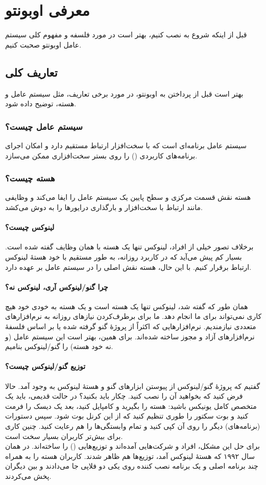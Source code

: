 \chapter{معرفی اوبونتو}
قبل از اینکه شروع به نصب کنیم، بهتر است در مورد فلسفه و مفهوم کلی سیستم عامل اوبونتو صحبت کنیم.
\section{تعاریف کلی}
بهتر است قبل از پرداختن به اوبونتو، در مورد برخی تعاریف، مثل سیستم عامل و هسته، توضیح داده شود.
\subsection{سیستم عامل چیست؟}
سیستم عامل برنامه‌ای است که با سخت‌افزار ارتباط مستقیم دارد و امکان اجرای برنامه‌های کاربردی () را روی بستر سخت‌افزاری ممکن می‌سازد.
\subsection{هسته چیست؟}
هسته نقش قسمت مرکزی و سطح پایین یک سیستم عامل را ایفا می‌کند و وظایفی مانند ارتباط با سخت‌افزار و بارگذاری درایورها را به دوش می‌کشد.
\subsubsection{لینوکس چیست؟}
برخلاف تصور خیلی از افراد، لینوکس تنها یک هسته با همان وظایف گفته شده است. بسیار کم پیش می‌آید که در کاربرد روزانه، به طور مستقیم با خود هستهٔ لینوکس ارتباط برقرار کنیم. با این حال، هسته نقش اصلی را در سیستم عامل بر عهده دارد.
\subsubsection{چرا گنو/لینوکس آری، لینوکس نه؟}
همان طور که گفته شد، لینوکس تنها یک هسته است و یک هسته به خودی خود هیچ کاری نمی‌تواند برای ما انجام دهد. ما برای برطرف‌کردن نیازهای روزانه به نرم‌افزارهای متعددی نیازمندیم. نرم‌افزارهایی که اکثراً از پروژهٔ گنو گرفته شده یا بر اساس فلسفهٔ نرم‌افزارهای آزاد و مجوز  ساخته شده‌اند. برای همین، بهتر است این سیستم عامل (و نه خود هسته) را گنو/لینوکس بنامیم.
\subsubsection{توزیع گنو/لینوکس چیست؟}
گفتیم که پروژهٔ گنو/لینوکس از پیوستن ابزارهای گنو و هستهٔ لینوکس به وجود آمد. حالا فرض کنید که بخواهید آن را نصب کنید. چکار باید بکنید؟ در حالت قدیمی، باید یک متخصص کامل یونیکس باشید: هسته را بگیرید و کامپایل کنید، بعد یک دیسک را فرمت کنید و بوت سکتور را طوری تنظیم کنید که از این کرنل بوت شود. سپس دستورات (برنامه‌های) دیگر را روی آن کپی کنید و تمام وابستگی‌ها را هم رعایت کنید. چنین کاری برای بیش‌تر کاربران بسیار سخت است.\\
برای حل این مشکل، افراد و شرکت‌هایی آمده‌اند و توزیع‌هایی () را ساخته‌اند. در همان سال ۱۹۹۲ که هستهٔ لینوکس آمد، توزیع‌ها هم ظاهر شدند. کاربران هسته را به همراه چند برنامه اصلی و یک برنامه نصب کننده روی یکی دو فلاپی جا می‌دادند و بین دیگران پخش می‌کردند.
